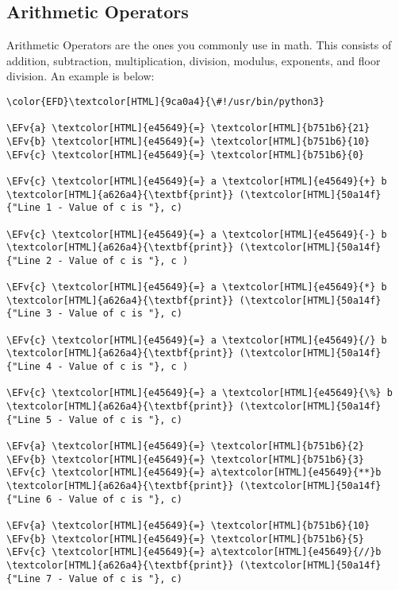 \documentclass{scrartcl}
\newcommand{\EFv}[1]{\textcolor{EFv}{#1}} %
\begin{document}
\subsection{Arithmetic Operators}
\label{sec:org4111780}
Arithmetic Operators are the ones you commonly use in math. This consists of
addition, subtraction, multiplication, division, modulus, exponents, and floor
division. An example is below:
\begin{Code}
\begin{Verbatim}[]
\color{EFD}\textcolor[HTML]{9ca0a4}{\#!/usr/bin/python3}

\EFv{a} \textcolor[HTML]{e45649}{=} \textcolor[HTML]{b751b6}{21}
\EFv{b} \textcolor[HTML]{e45649}{=} \textcolor[HTML]{b751b6}{10}
\EFv{c} \textcolor[HTML]{e45649}{=} \textcolor[HTML]{b751b6}{0}

\EFv{c} \textcolor[HTML]{e45649}{=} a \textcolor[HTML]{e45649}{+} b
\textcolor[HTML]{a626a4}{\textbf{print}} (\textcolor[HTML]{50a14f}{"Line 1 - Value of c is "}, c)

\EFv{c} \textcolor[HTML]{e45649}{=} a \textcolor[HTML]{e45649}{-} b
\textcolor[HTML]{a626a4}{\textbf{print}} (\textcolor[HTML]{50a14f}{"Line 2 - Value of c is "}, c )

\EFv{c} \textcolor[HTML]{e45649}{=} a \textcolor[HTML]{e45649}{*} b
\textcolor[HTML]{a626a4}{\textbf{print}} (\textcolor[HTML]{50a14f}{"Line 3 - Value of c is "}, c)

\EFv{c} \textcolor[HTML]{e45649}{=} a \textcolor[HTML]{e45649}{/} b
\textcolor[HTML]{a626a4}{\textbf{print}} (\textcolor[HTML]{50a14f}{"Line 4 - Value of c is "}, c )

\EFv{c} \textcolor[HTML]{e45649}{=} a \textcolor[HTML]{e45649}{\%} b
\textcolor[HTML]{a626a4}{\textbf{print}} (\textcolor[HTML]{50a14f}{"Line 5 - Value of c is "}, c)

\EFv{a} \textcolor[HTML]{e45649}{=} \textcolor[HTML]{b751b6}{2}
\EFv{b} \textcolor[HTML]{e45649}{=} \textcolor[HTML]{b751b6}{3}
\EFv{c} \textcolor[HTML]{e45649}{=} a\textcolor[HTML]{e45649}{**}b
\textcolor[HTML]{a626a4}{\textbf{print}} (\textcolor[HTML]{50a14f}{"Line 6 - Value of c is "}, c)

\EFv{a} \textcolor[HTML]{e45649}{=} \textcolor[HTML]{b751b6}{10}
\EFv{b} \textcolor[HTML]{e45649}{=} \textcolor[HTML]{b751b6}{5}
\EFv{c} \textcolor[HTML]{e45649}{=} a\textcolor[HTML]{e45649}{//}b
\textcolor[HTML]{a626a4}{\textbf{print}} (\textcolor[HTML]{50a14f}{"Line 7 - Value of c is "}, c)
\end{Verbatim}
\end{Code}
\end{document}
